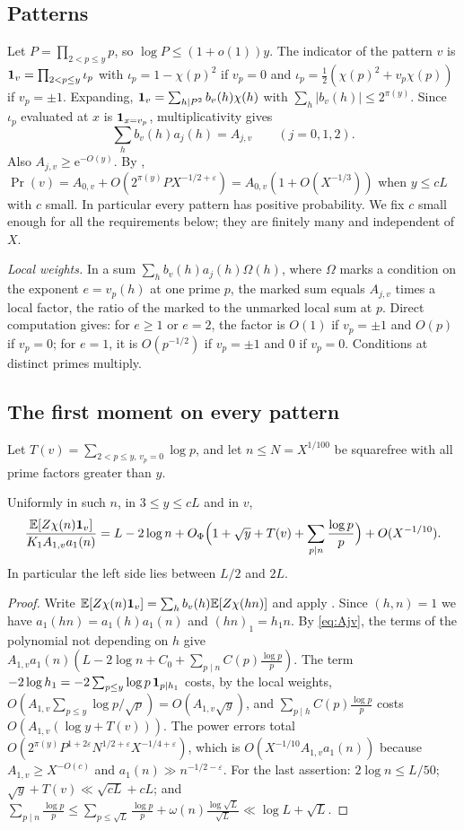 \documentclass[11pt,colorlinks]{charlie}
\newcommand{\e}{\mathrm{e}}
\begin{document}
\subsection{Patterns}
Let $P=\prod_{2<p\le y}p$, so $\log P\le(1+o(1))y$. The indicator of the pattern $v$ is $\mathbf{1}_v=\prod_{2<p\le y}\iota_p$ with $\iota_p=1-\chi(p)^2$ if $v_p=0$ and $\iota_p=\frac12(\chi(p)^2+v_p\chi(p))$ if $v_p=\pm1$. Expanding, $\mathbf{1}_v=\sum_{h\mid P^2}b_v(h)\chi(h)$ with $\sum_h|b_v(h)|\le2^{\pi(y)}$. Since $\iota_p$ evaluated at $x$ is $\mathbf{1}_{x=v_p}$, multiplicativity gives
\begin{equation}\label{eq:Ajv}
 \sum_hb_v(h)a_j(h)=A_{j,v}\qquad(j=0,1,2).
\end{equation}
Also $A_{j,v}\ge\e^{-O(y)}$. By , $\Pr(v)=A_{0,v}+O(2^{\pi(y)}PX^{-1/2+\varepsilon})=A_{0,v}(1+O(X^{-1/3}))$ when $y\le cL$ with $c$ small. In particular every pattern has positive probability. We fix $c$ small enough for all the requirements below; they are finitely many and independent of $X$.

\emph{Local weights.} In a sum $\sum_hb_v(h)a_j(h)\Omega(h)$, where $\Omega$ marks a condition on the exponent $e=v_p(h)$ at one prime $p$, the marked sum equals $A_{j,v}$ times a local factor, the ratio of the marked to the unmarked local sum at $p$. Direct computation gives: for $e\ge1$ or $e=2$, the factor is $O(1)$ if $v_p=\pm1$ and $O(p)$ if $v_p=0$; for $e=1$, it is $O(p^{-1/2})$ if $v_p=\pm1$ and $0$ if $v_p=0$. Conditions at distinct primes multiply.

\subsection{The first moment on every pattern}
Let $T(v)=\sum_{2<p\le y,\,v_p=0}\log p$, and let $n\le N=X^{1/100}$ be squarefree with all prime factors greater than $y$.

\begin{lemma}\label{lem:first-pattern}
Uniformly in such $n$, in $3\le y\le cL$ and in $v$,
\[
 \frac{\mathbb{E}[Z\chi(n)\mathbf{1}_v]}{K_1A_{1,v}a_1(n)}=L-2\log n+O_\Phi\Big(1+\sqrt y+T(v)+\sum_{p\mid n}\frac{\log p}p\Big)+O(X^{-1/10}).
\]
In particular the left side lies between $L/2$ and $2L$.
\end{lemma}
\begin{proof}
Write $\mathbb{E}[Z\chi(n)\mathbf{1}_v]=\sum_hb_v(h)\mathbb{E}[Z\chi(hn)]$ and apply . Since $(h,n)=1$ we have $a_1(hn)=a_1(h)a_1(n)$ and $(hn)_1=h_1n$. By \eqref{eq:Ajv}, the terms of the polynomial not depending on $h$ give $A_{1,v}a_1(n)(L-2\log n+C_0+\sum_{p\mid n}C(p)\frac{\log p}p)$. The term $-2\log h_1=-2\sum_{p\le y}\log p\,\mathbf{1}_{p\mid h_1}$ costs, by the local weights, $O(A_{1,v}\sum_{p\le y}\log p/\sqrt p)=O(A_{1,v}\sqrt y)$, and $\sum_{p\mid h}C(p)\frac{\log p}p$ costs $O(A_{1,v}(\log y+T(v)))$. The power errors total $O(2^{\pi(y)}P^{1+2\varepsilon}N^{1/2+\varepsilon}X^{-1/4+\varepsilon})$, which is $O(X^{-1/10}A_{1,v}a_1(n))$ because $A_{1,v}\ge X^{-O(c)}$ and $a_1(n)\gg n^{-1/2-\varepsilon}$. For the last assertion: $2\log n\le L/50$; $\sqrt y+T(v)\ll\sqrt{cL}+cL$; and $\sum_{p\mid n}\frac{\log p}p\le\sum_{p\le\sqrt L}\frac{\log p}p+\omega(n)\frac{\log\sqrt L}{\sqrt L}\ll\log L+\sqrt L$.
\end{proof}
\end{document}
